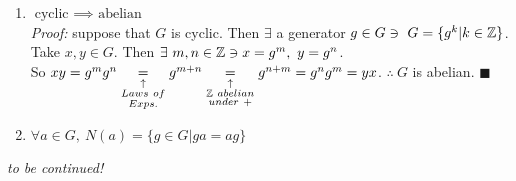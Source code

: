 \begin{enumerate}
\item $\boxed{\text{cyclic }\implies \text{ abelian}}$ \\
\textit{Proof: } suppose that $G$ is cyclic. Then $\exists$ a generator $g\in G \ni \ G=\{g^k | k \in {\mathbb{ Z}}\}$. Take $x,y \in G$. Then $\exists \ m,n \in \Z \ni x=g^m, \ y=g^n$. \\

So $xy = g^m g^n \underset{\substack{\uparrow \\ Laws \ of \\ Exps.}}{=} g^{m+n} \underset{\substack{\uparrow \\ \Z \ abelian \\ under \ +}}{=} g^{n+m} = g^ng^m = yx$. $\therefore \ G$ is abelian. $\blacksquare$ 

\item $\forall a \in G, \ N(a) = \{g \in G | ga = ag \} $

\end{enumerate}


\textit{to be continued!}